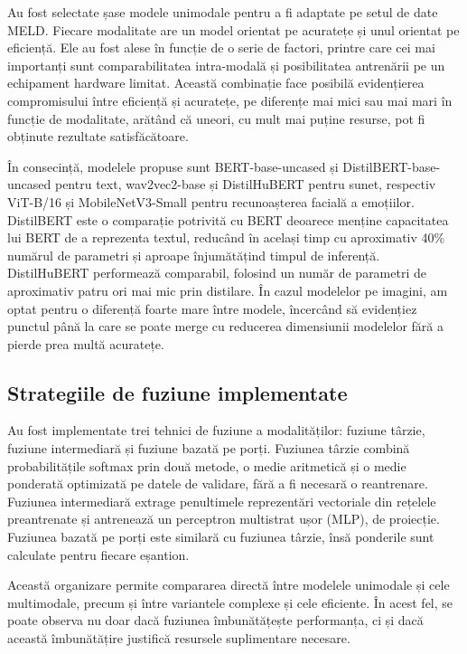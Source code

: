 \documentclass[12pt, a4paper]{article}
\begin{document}
Au fost selectate șase modele unimodale pentru a fi adaptate pe setul de date MELD. Fiecare modalitate are un model orientat pe acuratețe și unul orientat pe eficiență. Ele au fost alese în funcție de o serie de factori, printre care cei mai importanți sunt comparabilitatea intra-modală și posibilitatea antrenării pe un echipament hardware limitat. Această combinație face posibilă evidențierea compromisului între eficiență și acuratețe, pe diferențe mai mici sau mai mari în funcție de modalitate, arătând că uneori, cu mult mai puține resurse, pot fi obținute rezultate satisfăcătoare.

În consecință, modelele propuse sunt BERT-base-uncased și DistilBERT-base-uncased pentru text, wav2vec2-base și DistilHuBERT pentru sunet, respectiv ViT-B/16 și MobileNetV3-Small pentru recunoașterea facială a emoțiilor. DistilBERT este o comparație potrivită cu BERT deoarece menține capacitatea lui BERT de a reprezenta textul, reducând în același timp cu aproximativ 40\% numărul de parametri și aproape înjumătățind timpul de inferență. DistilHuBERT performează comparabil, folosind un număr de parametri de aproximativ patru ori mai mic prin distilare. În cazul modelelor pe imagini, am optat pentru o diferență foarte mare între modele, încercând să evidențiez punctul până la care se poate merge cu reducerea dimensiunii modelelor fără a pierde prea multă acuratețe.

\subsection{Strategiile de fuziune implementate}

Au fost implementate trei tehnici de fuziune a modalităților: fuziune târzie, fuziune intermediară și fuziune bazată pe porți. Fuziunea târzie combină probabilitățile softmax prin două metode, o medie aritmetică și o medie ponderată optimizată pe datele de validare, fără a fi necesară o reantrenare. Fuziunea intermediară extrage penultimele reprezentări vectoriale din rețelele preantrenate și antrenează un perceptron multistrat ușor (MLP), de proiecție. Fuziunea bazată pe porți este similară cu fuziunea târzie, însă ponderile sunt calculate pentru fiecare eșantion.

Această organizare permite compararea directă între modelele unimodale și cele multimodale, precum și între variantele complexe și cele eficiente. În acest fel, se poate observa nu doar dacă fuziunea îmbunătățește performanța, ci și dacă această îmbunătățire justifică resursele suplimentare necesare.
\end{document}
